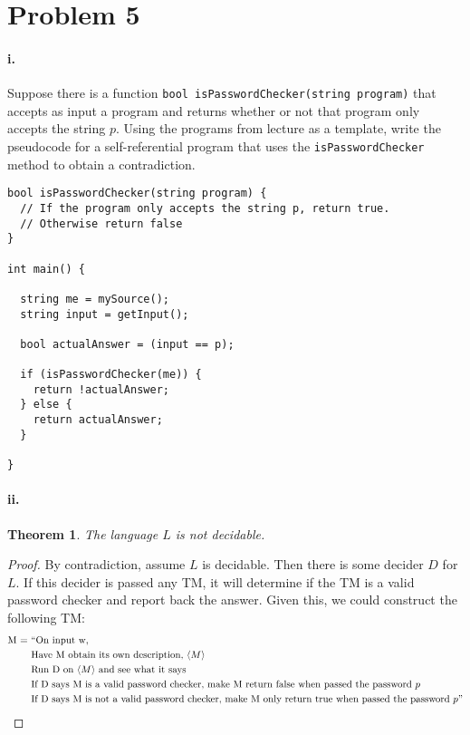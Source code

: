 \documentclass[10pt,letter]{article}
\newtheorem*{thm}{Theorem}
\begin{document}
\section*{Problem 5}

\paragraph{i.} Suppose there is a function \texttt{bool isPasswordChecker(string program)} that accepts as input a program and returns whether or not that program only accepts the string $p$. Using the programs from lecture as a template, write the pseudocode for a self-referential program that uses the \texttt{isPasswordChecker} method to obtain a contradiction. 
{\selectfont
\begin{lstlisting}
bool isPasswordChecker(string program) {
  // If the program only accepts the string p, return true.
  // Otherwise return false
}

int main() {

  string me = mySource();
  string input = getInput();

  bool actualAnswer = (input == p);

  if (isPasswordChecker(me)) {
    return !actualAnswer;
  } else {
    return actualAnswer;
  }

}
\end{lstlisting}

\paragraph{ii.} 
\begin{thm} The language $L$ is not decidable. \end{thm}
\begin{proof} By contradiction, assume $L$ is decidable. Then there is some decider $D$ for $L$. If this decider is passed any TM, it will determine if the TM is a valid password checker and report back the answer. Given this, we could construct the following TM:
\begin{align*}
\text{M = }&\text{``On input w,}\\
&\text{Have M obtain its own description, }\langle M \rangle\\
&\text{Run D on }\langle M \rangle \text{ and see what it says}\\
&\text{If D says M is a valid password checker, make M return false when passed the password } p\\
&\text{If D says M is not a valid password checker, make M only return true when passed the password } p"
\end{align*}


\end{proof}}
\end{document}
